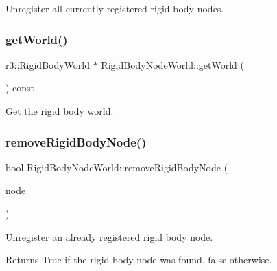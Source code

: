 Unregister all currently registered rigid body nodes. 

\mbox{\label{class_rigid_body_node_world_aa1ddbb33d36e112134c54cbb5483df26}} 
\subsubsection{\texorpdfstring{get\+World()}{getWorld()}}
{\footnotesize\ttfamily r3\+::\+Rigid\+Body\+World $\ast$ Rigid\+Body\+Node\+World\+::get\+World (\begin{DoxyParamCaption}{ }\end{DoxyParamCaption}) const}



Get the rigid body world. 

\mbox{\label{class_rigid_body_node_world_a444034dce9139e77f7714779afb04235}} 
\subsubsection{\texorpdfstring{remove\+Rigid\+Body\+Node()}{removeRigidBodyNode()}}
{\footnotesize\ttfamily bool Rigid\+Body\+Node\+World\+::remove\+Rigid\+Body\+Node (\begin{DoxyParamCaption}\item[{\mbox{\hyperlink{class_rigid_body_node}{Rigid\+Body\+Node}} $\ast$}]{node }\end{DoxyParamCaption})}



Unregister an already registered rigid body node. 

\begin{DoxyReturn}{Returns}
True if the rigid body node was found, false otherwise. 
\end{DoxyReturn}
\mbox{\label{class_rigid_body_node_world_a3b381c6da9b1374eb12117c6e8d0b57a}} 
